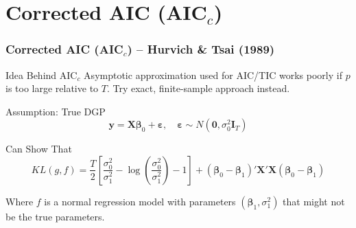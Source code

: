 \section{Corrected AIC (AIC$_c$)}
\begin{frame}
  \frametitle{Corrected AIC (AIC$_c$) -- Hurvich \& Tsai (1989)}

  \begin{block}{Idea Behind AIC$_c$}
    Asymptotic approximation used for AIC/TIC works poorly if $p$ is too large relative to $T$. \alert{Try exact, finite-sample approach instead.} 
  \end{block}

  \pause

  \begin{block}{Assumption: True DGP}
    \vspace{-1.5em}
    \[
      \mathbf{y} = \mathbf{X}\boldsymbol{\beta}_0 + \boldsymbol{\varepsilon}, \quad \boldsymbol{\varepsilon} \sim N(\mathbf{0}, \sigma_0^2 \mathbf{I}_T)
    \]

    \pause

    \begin{block}{Can Show That}
      \vspace{-1em}
      \[
        KL(g,f) = \frac{T}{2}\left[ \frac{\sigma_0^2}{\sigma_1^2} - \log \left( \frac{\sigma_0^2}{\sigma_1^2} \right) - 1\right] + (\boldsymbol{\beta}_0 - \boldsymbol{\beta}_1)' \mathbf{X}'\mathbf{X} (\boldsymbol{\beta}_0 - \boldsymbol{\beta}_1)
      \]

      \vspace{1em}
    
      Where $f$ is a normal regression model with parameters $(\boldsymbol{\beta}_1, \sigma_1^2)$ that \alert{might not be the true parameters.} 
    \end{block}
    
  \end{block}
\end{frame}
